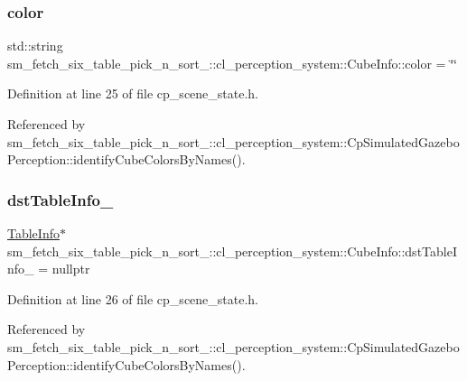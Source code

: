 \subsubsection{\texorpdfstring{color}{color}}
{\footnotesize\ttfamily std\+::string sm\+\_\+fetch\+\_\+six\+\_\+table\+\_\+pick\+\_\+n\+\_\+sort\+\_\+::cl\+\_\+perception\+\_\+system\+::\+Cube\+Info\+::color = \char`\"{}\char`\"{}}



Definition at line 25 of file cp\+\_\+scene\+\_\+state.\+h.



Referenced by sm\+\_\+fetch\+\_\+six\+\_\+table\+\_\+pick\+\_\+n\+\_\+sort\+\_\+::cl\+\_\+perception\+\_\+system\+::\+Cp\+Simulated\+Gazebo\+Perception\+::identify\+Cube\+Colors\+By\+Names().

\mbox{\label{structsm__fetch__six__table__pick__n__sort__1_1_1cl__perception__system_1_1CubeInfo_a5696cb5fc4f2d105e28c708844dd47a1}} 
\subsubsection{\texorpdfstring{dst\+Table\+Info\+\_\+}{dstTableInfo\_}}
{\footnotesize\ttfamily \hyperlink{structsm__fetch__six__table__pick__n__sort__1_1_1cl__perception__system_1_1TableInfo}{Table\+Info}$\ast$ sm\+\_\+fetch\+\_\+six\+\_\+table\+\_\+pick\+\_\+n\+\_\+sort\+\_\+::cl\+\_\+perception\+\_\+system\+::\+Cube\+Info\+::dst\+Table\+Info\+\_\+ = nullptr}



Definition at line 26 of file cp\+\_\+scene\+\_\+state.\+h.



Referenced by sm\+\_\+fetch\+\_\+six\+\_\+table\+\_\+pick\+\_\+n\+\_\+sort\+\_\+::cl\+\_\+perception\+\_\+system\+::\+Cp\+Simulated\+Gazebo\+Perception\+::identify\+Cube\+Colors\+By\+Names().

